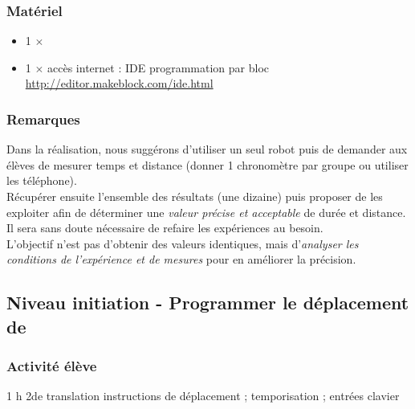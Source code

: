\subsubsection{Matériel}
\begin{itemize}
\item 1 $\times$ \matosMbot
   \item 1 $\times$ accès internet : IDE programmation par bloc \url{http://editor.makeblock.com/ide.html}
\end{itemize}



\subsubsection{Remarques}


\begin{methode}
    Dans la réalisation, nous suggérons d'utiliser un seul robot puis de demander aux élèves de mesurer temps et distance (donner 1 chronomètre par groupe ou utiliser les téléphone).\\
    Récupérer ensuite l'ensemble des résultats (une dizaine) puis proposer de les exploiter afin de déterminer une \emph{valeur précise et acceptable} de durée et distance. Il sera sans doute nécessaire de refaire les expériences au besoin.\\
	L'objectif n'est pas d'obtenir des valeurs identiques, mais d'\emph{analyser les conditions de l'expérience et de mesures} pour en améliorer la précision.
\end{methode}

%
%

\newpage

\subsection{Niveau initiation - Programmer le déplacement de \mbot}

\subsubsection{Activité élève}

\cartouche
{1 h}         %
{2de}           %
{translation}        %
{}     %
{instructions de déplacement ; temporisation ; entrées clavier}       %


